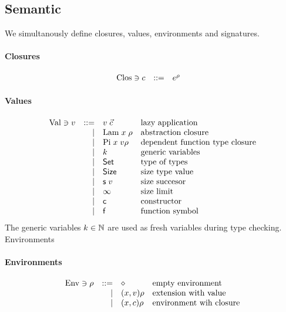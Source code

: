 \subsection{Semantic}
We simultanously define closures, values, environments and signatures.

\paragraph*{Closures}
\[
\begin{array}{lrll}
\mathrm{Clos} \ni c & ::= & e^{\rho} & 
\end{array}
\]

\paragraph*{Values}
\[
\begin{array}{lrll}
\mathrm{Val} \ni v & ::= & v \; \vec{c} & \mbox{lazy application}\\
& \mid & \mathrm{Lam} \; x \; \rho & \mbox{abstraction closure}\\
& \mid & \mathrm{Pi} \; x \; v \rho & \mbox{dependent function type closure}\\
& \mid & k & \mbox{generic variables}\\
& \mid & \mathsf{Set} & \mbox{type of types} \\
& \mid & \mathsf{Size} & \mbox{size type value}\\
& \mid & \mathsf{s}\; v & \mbox{size succesor}\\
& \mid & \infty & \mbox{size limit}\\
& \mid & \mathsf{c} & \mbox{constructor}\\
& \mid & \mathsf{f} & \mbox{function symbol}\\
\end{array}
\]
The generic variables $k \in \mathbb{N} $ are used as fresh variables during type checking.
Environments
\paragraph*{Environments}
\[
\begin{array}{lrll}
\mathrm{Env} \ni \rho & ::= & \diamond & \mbox{empty environment}\\
& \mid & (x,v) \rho & \mbox{extension with value}\\
& \mid & (x,c) \rho & \mbox{environment wih closure} 
\end{array}
\]

